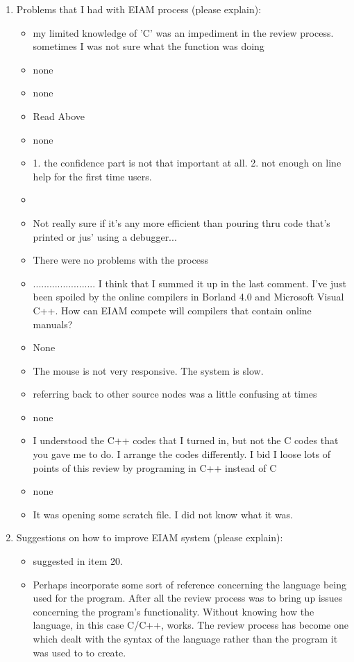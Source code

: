 \begin{enumerate}
\item  Problems that I had with EIAM process (please explain): 
\begin{itemize}
\item my limited knowledge of 'C' was an impediment in the review process.
sometimes I was not sure what the function was doing
\item none
\item none
\item Read Above

\item none
\item 1. the confidence part is not that important at all. 
2. not enough on line help for the first time users.

\item 

\item Not really sure if it's any more efficient than pouring thru code
that's printed or jus' using a debugger...
\item There were no problems with the process
\item 	     .......................
I think that I summed it up in the last comment.  I've just been
spoiled by the online compilers in Borland 4.0 and Microsoft Visual
C++.  How can EIAM compete will compilers that contain online manuals?


\item None
\item The mouse is not very responsive.  The system is slow.
\item referring back to other source nodes was a little confusing at times
\item none
\item I understood the C++ codes that I turned in, but not the C codes that
you gave me to do.  I arrange the codes differently.  I bid I loose
lots of points of this review by programing in C++ instead of C 
\item none
\item It was opening some scratch file.
I did not know what it was.
\end{itemize}

\item  Suggestions on how to improve EIAM system (please explain):
\begin{itemize}
\item suggested in item 20.
\item Perhaps incorporate some sort of reference concerning the language
being used for the program.  After all the review process was to bring
up issues concerning the program's functionality.  Without knowing how
the language, in this case C/C++, works.  The review process has
become one which dealt with the syntax of the language rather than the
program it was used to to create.


\end{itemize}
\end{enumerate}

